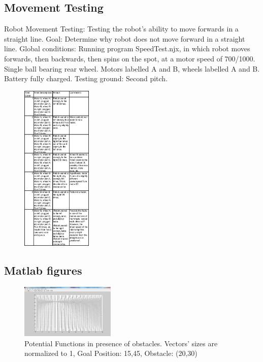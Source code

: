 \documentclass[conference,12pt]{IEEEtran}
\begin{document}
\subsection{Movement Testing} \label{mov:test}
Robot Movement Testing: Testing the robot’s ability to move forwards in a straight line.
Goal: Determine why robot does not move forward in a straight line.
Global conditions: Running program SpeedTest.njx, in which robot moves forwards, then backwards, then spins on the spot, at a motor speed of 700/1000. Single ball bearing rear wheel. Motors labelled A and B, wheels labelled A and B. Battery fully charged.
Testing ground: Second pitch.
\begin{figure}[htp]
\begin{center}
\leavevmode
\includegraphics[width=0.3\textwidth] {tableOfTests.png}
\end{center}
\end{figure}

\subsection{Matlab figures} \label{fig:matlab}
\begin{figure}[htp]
\begin{center}
\leavevmode
\includegraphics[width=0.4\textwidth] {PF.png}
\end{center}
\caption{Potential Functions in presence of obstacles. Vectors' sizes are normalized to 1, Goal Position: 15,45, Obstacle: (20,30)}
\label{fig:PF1}
\end{figure}
\end{document}
